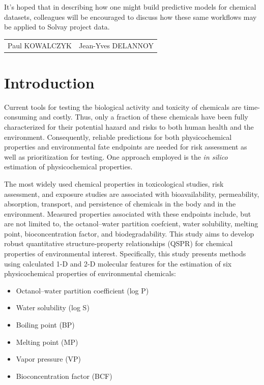 \documentclass[10pt, letter]{article}
\renewcommand{\=}{\, =\, }
\newcommand{\+}{\, +\, }
\renewcommand{\-}{\, -\, }
\begin{document}
It's hoped that in describing how one might build predictive models for chemical datasets, colleagues will be encouraged to discuss how these same workflows may be applied to Solvay project data.


\vspace*{1cm}
\begin{tabular*}{5.03\textwidth}{lr}
Paul KOWALCZYK &\hspace*{9cm} Jean-Yves DELANNOY\\
\end{tabular*}

\newpage

\tableofcontents

\newpage

\section{Introduction}

Current tools for testing the biological activity and toxicity of chemicals are
time-consuming and costly. Thus, only a fraction of these chemicals have been
fully characterized for their potential hazard and risks to both human health and
the environment. Consequently, 
reliable predictions for both physicochemical properties and environmental fate endpoints are needed for risk assessment as well as
prioritization for testing. One approach employed is the \textit{in silico} estimation of physicochemical properties.

The most widely used chemical properties in toxicological
studies, risk assessment, and exposure studies are
associated with bioavailability, permeability, absorption,
transport, and persistence of chemicals in the body and
in the environment. Measured properties associated with these endpoints include,
but are not limited to, the octanol–water partition
coefcient, water solubility, melting point, bioconcentration
factor, and biodegradability. This study aims to develop robust quantitative structure-property relationships (QSPR) for chemical properties of environmental interest. Specifically, this study presents methods using calculated 1-D and 2-D molecular features for
the estimation of six physicochemical properties of environmental chemicals:
\begin{itemize}
\item Octanol–water partition coefficient (log P)
\item Water solubility (log S)
\item Boiling point (BP)
\item Melting point (MP)
\item Vapor pressure (VP)
\item Bioconcentration factor (BCF)
\end{itemize}
\end{document}
